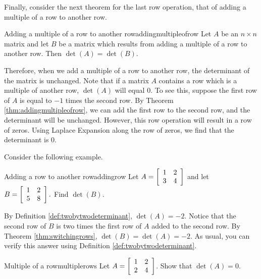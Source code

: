 Finally, consider the next theorem for the last row operation, that of adding a multiple of a row
to another row. 

\begin{theorem}{Adding a multiple of a row to another row}{addingmultipleofrow}
Let $A$ be an $n\times n$ matrix and let $B$ be a matrix
which results from adding a multiple of a row to another row.
 Then $\det \left( A\right) =\det
\left( B \right) $.
\end{theorem}

Therefore, when we add a multiple of a row to another row, the determinant of the matrix is unchanged. 
Note that if a matrix $A$ contains a row which is a multiple of another row, $\det \left(A\right)$ will equal $0$. To see this,
suppose the first row of $A$ is equal to $-1$ times the second row. By Theorem \ref{thm:addingmultipleofrow}, we can 
add the first row to the second row, and the determinant will be unchanged. However, this row operation will result in a row of zeros.
Using Laplace Expansion along the row of zeros, we find that the determinant is $0$. 

Consider the following example.

\begin{example}{Adding a row to another row}{addingrow}
Let $A=\left[
\begin{array}{rr}
1 & 2 \\
3 & 4
\end{array}
\right] $ and let $B=\left[
\begin{array}{rr}
1 & 2 \\
5 & 8
\end{array}
\right] .$ 
Find $\det \left(B\right)$.
\end{example}

\begin{solution}
By Definition \ref{def:twobytwodeterminant}, $\det \left(A\right) = -2$. 
Notice that the second row of $B$ is two times the first row of $A$ added
to the second row. 
By Theorem \ref{thm:switchingrows}, $\det \left( B\right) = \det \left( A \right)
=-2$.
As usual, you can verify this answer using Definition \ref{def:twobytwodeterminant}.
\end{solution}

\begin{example}{Multiple of a row}{multiplerows}
Let $A = \left[ \begin{array}{rr}
1 & 2 \\
2 & 4 
\end{array} \right]$. Show that $\det \left( A \right) = 0$. 
\end{example}

